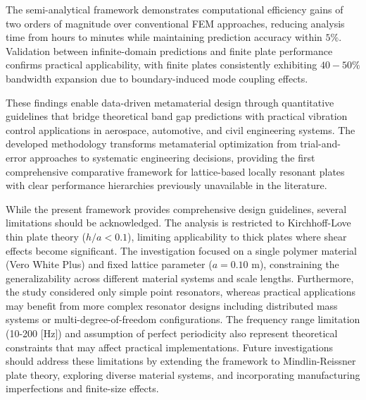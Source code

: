 \documentclass[review,numbers,sort&compress]{elsarticle}
\begin{document}
The semi-analytical framework demonstrates computational efficiency gains of two orders of magnitude over conventional FEM approaches, reducing analysis time from hours to minutes while maintaining prediction accuracy within $5\%$. Validation between infinite-domain predictions and finite plate performance confirms practical applicability, with finite plates consistently exhibiting $40-50\%$ bandwidth expansion due to boundary-induced mode coupling effects.

These findings enable data-driven metamaterial design through quantitative guidelines that bridge theoretical band gap predictions with practical vibration control applications in aerospace, automotive, and civil engineering systems. The developed methodology transforms metamaterial optimization from trial-and-error approaches to systematic engineering decisions, providing the first comprehensive comparative framework for lattice-based locally resonant plates with clear performance hierarchies previously unavailable in the literature.

While the present framework provides comprehensive design guidelines, several limitations should be acknowledged. The analysis is restricted to Kirchhoff-Love thin plate theory ($h/a < 0.1$), limiting applicability to thick plates where shear effects become significant. The investigation focused on a single polymer material (Vero White Plus) and fixed lattice parameter ($a = 0.10$ m), constraining the generalizability across different material systems and scale lengths. Furthermore, the study considered only simple point resonators, whereas practical applications may benefit from more complex resonator designs including distributed mass systems or multi-degree-of-freedom configurations. The frequency range limitation (10-200 [Hz]) and assumption of perfect periodicity also represent theoretical constraints that may affect practical implementations. Future investigations should address these limitations by extending the framework to Mindlin-Reissner plate theory, exploring diverse material systems, and incorporating manufacturing imperfections and finite-size effects.
\end{document}
